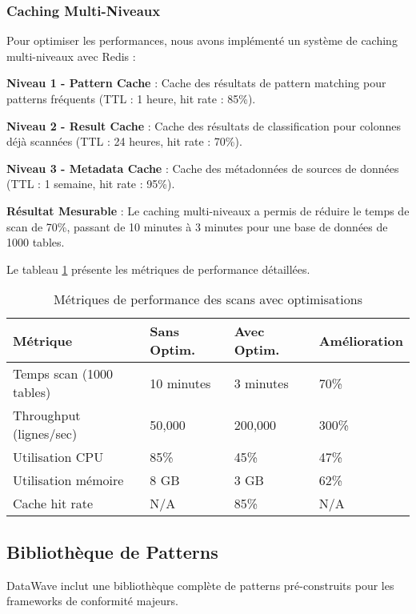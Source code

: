 \subsubsection{Caching Multi-Niveaux}

Pour optimiser les performances, nous avons implémenté un système de caching multi-niveaux avec Redis :

\textbf{Niveau 1 - Pattern Cache} : Cache des résultats de pattern matching pour patterns fréquents (TTL : 1 heure, hit rate : 85\%).

\textbf{Niveau 2 - Result Cache} : Cache des résultats de classification pour colonnes déjà scannées (TTL : 24 heures, hit rate : 70\%).

\textbf{Niveau 3 - Metadata Cache} : Cache des métadonnées de sources de données (TTL : 1 semaine, hit rate : 95\%).

\textbf{Résultat Mesurable} : Le caching multi-niveaux a permis de réduire le temps de scan de 70\%, passant de 10 minutes à 3 minutes pour une base de données de 1000 tables.

Le tableau \ref{tab:metriques_performance_scan} présente les métriques de performance détaillées.

\begin{table}[htpb]
\centering
\caption{Métriques de performance des scans avec optimisations}
\label{tab:metriques_performance_scan}
\begin{tabular}{|p{}|p{}|p{}|p{}|}
\hline
\textbf{Métrique} & \textbf{Sans Optim.} & \textbf{Avec Optim.} & \textbf{Amélioration} \\
\hline
Temps scan (1000 tables) & 10 minutes & 3 minutes & 70\% \\
\hline
Throughput (lignes/sec) & 50,000 & 200,000 & 300\% \\
\hline
Utilisation CPU & 85\% & 45\% & 47\% \\
\hline
Utilisation mémoire & 8 GB & 3 GB & 62\% \\
\hline
Cache hit rate & N/A & 85\% & N/A \\
\hline
\end{tabular}
\end{table}

\subsection{Bibliothèque de Patterns}

DataWave inclut une bibliothèque complète de patterns pré-construits pour les frameworks de conformité majeurs.

